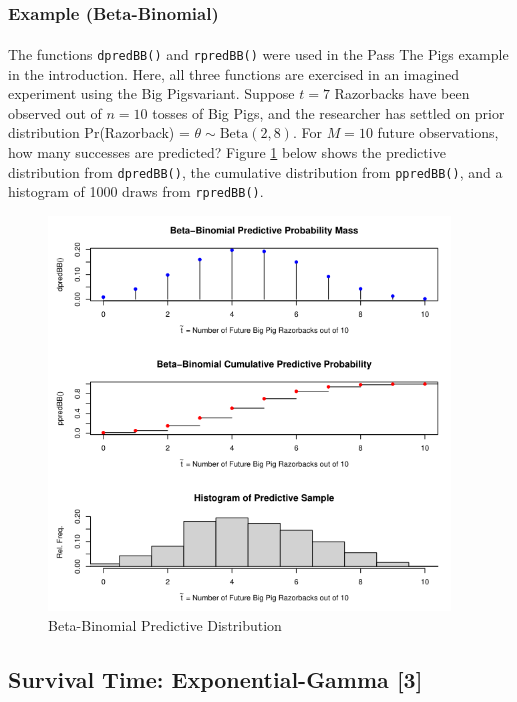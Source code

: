 \documentclass[12pt, a4paper]{article}
\begin{document}
    \subsubsection{Example (Beta-Binomial)}

The functions \texttt{dpredBB()} and \texttt{rpredBB()} were used in the Pass The Pigs\textsuperscript{\circledR} example in the introduction.  Here, all three functions are exercised in an imagined experiment using the Big Pigs\texttrademark  variant.  Suppose $t=7$ Razorbacks have been observed out of $n=10$ tosses of Big Pigs\texttrademark, and the researcher has settled on prior distribution Pr(Razorback) = $\theta\sim\text{Beta}(2,8)$.  For $M = 10$ future observations, how many successes are predicted?  Figure \ref{fig:BBdist} below shows the predictive distribution from \texttt{dpredBB()}, the cumulative distribution from \texttt{ppredBB()}, and a histogram of 1000 draws from \texttt{rpredBB()}.

\begin{figure}[ht]
  \centering
  \includegraphics[width=0.95\textwidth]{./Graphics/DistributionPlots/BetaBinomial}
  \caption{Beta-Binomial Predictive Distribution}
  \label{fig:BBdist}
\end{figure}

\vspace{2cm}




    \subsection{Survival Time:  Exponential-Gamma [3]}
\end{document}
